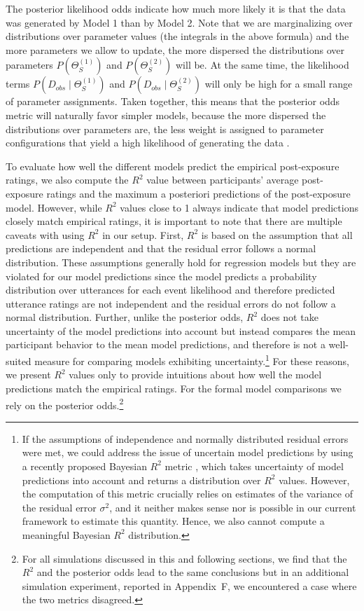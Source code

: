 \noindent The posterior likelihood odds indicate how much more likely it is that the data was generated by Model 1 than by Model 2. Note that we are marginalizing over distributions over parameter values (the integrals in the above formula) and the more parameters we allow to update, the more dispersed the distributions over parameters  $P\left(\Theta_{S}^{(1)}\right)$ and $P\left(\Theta_{S}^{(2)}\right)$ will be. At the same time, the likelihood terms $P\left(D_{obs} \mid \Theta_{S}^{(1)}\right)$ and $P\left(D_{obs} \mid \Theta_{S}^{(2)}\right)$ will only be high for a small range of parameter assignments. Taken together, this means that the posterior odds metric will naturally favor simpler models, because the more dispersed the distributions over parameters are, the less weight is assigned to parameter configurations that yield a high likelihood of generating the data \cite[a property often referred to as Bayesian Occam's razor; see, e.g., ][]{MacKay1992,Neal1995}. 

To evaluate how well the different models predict the empirical post-exposure ratings, we also compute the $R^2$ value between participants' average 
post-exposure ratings and the maximum a posteriori predictions of the post-exposure model. However, while $R^2$ values close to 1 always indicate 
that model predictions closely match empirical ratings, it is important to note that there are multiple caveats with using $R^2$ in our setup. 
First, $R^2$ is based on the assumption that all predictions are independent and that the residual error follows a normal distribution. 
These assumptions generally hold for regression models but they are violated for our model predictions since the model predicts a 
probability distribution over utterances for each event likelihood and therefore predicted utterance ratings are not independent and the 
residual errors do not follow a normal distribution. Further, unlike the posterior odds,
$R^2$ does not take uncertainty of the model predictions into account but instead compares the mean participant behavior to the mean 
model predictions, and therefore is not a well-suited measure for comparing models exhibiting uncertainty.\footnote{If the assumptions of independence and normally distributed 
residual errors were met, we could address the issue of uncertain model predictions by using a recently proposed Bayesian $R^2$ metric \cite{Gelman2019}, 
which takes uncertainty of model predictions into account and returns a distribution over $R^2$ values. 
However, the computation of this metric crucially relies on estimates of the variance of the residual error $\sigma^2$, and it neither 
makes sense nor is possible in our current framework to estimate this quantity. Hence, we also cannot compute a meaningful Bayesian $R^2$ distribution.} 
For these reasons, we present $R^2$ values only to provide intuitions about how well the model predictions match the empirical ratings. For the formal model comparisons we 
rely on the posterior odds.\footnote{For all simulations discussed in this and following sections, we find that the $R^2$ and the posterior odds lead to the same conclusions but in an additional simulation experiment, reported in Appendix~F, we encountered a case where the two metrics disagreed.} 

